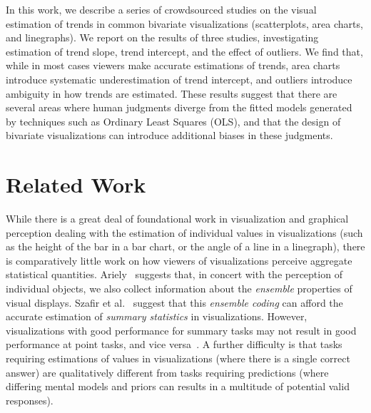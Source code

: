 \documentclass{sigchi}
\begin{document}
In this work, we describe a series of crowdsourced studies on the visual estimation of trends in common bivariate visualizations (scatterplots, area charts, and linegraphs). We report on the results of three studies, investigating estimation of trend slope, trend intercept, and the effect of outliers. We find that, while in most cases viewers make accurate estimations of trends, area charts introduce systematic underestimation of trend intercept, and outliers introduce ambiguity in how trends are estimated. These results suggest that there are several areas where human judgments diverge from the fitted models generated by techniques such as Ordinary Least Squares (OLS), and that the design of bivariate visualizations can introduce additional biases in these judgments.

\section{Related Work}

While there is a great deal of foundational work in visualization and graphical perception dealing with the estimation of individual values in visualizations (such as the height of the bar in a bar chart, or the angle of a line in a linegraph), there is comparatively little work on how viewers of visualizations perceive aggregate statistical quantities. Ariely~\cite{ariely2001seeing} suggests that, in concert with the perception of individual objects, we also collect information about the \emph{ensemble} properties of visual displays. Szafir et al.~\cite{szafir2016four} suggest that this \emph{ensemble coding} can afford the accurate estimation of \emph{summary statistics} in visualizations. However, visualizations with good performance for summary tasks may not result in good performance at point tasks, and vice versa~\cite{albers2014task,fuchs2013evaluation}. A further difficulty is that tasks requiring estimations of values in visualizations (where there is a single correct answer) are qualitatively different from tasks requiring predictions (where differing mental models and priors can results in a multitude of potential valid responses).
\end{document}
